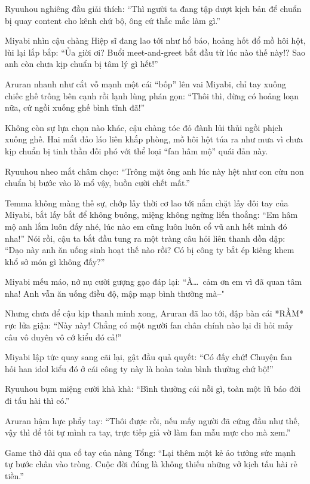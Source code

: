 \documentclass[../main.tex]{subfiles}
\begin{document}
Ryuuhou nghiêng đầu giải thích: ``Thì người ta đang tập dượt kịch bản để chuẩn bị quay content cho kênh chứ bộ, ông cứ thắc mắc làm gì.''

Miyabi nhìn cậu chàng Hiệp sĩ đang lao tới như hổ báo, hoảng hốt đổ mồ hôi hột, lùi lại lắp bắp: ``Ủa giời ơi? Buổi meet-and-greet bắt đầu từ lúc nào thế này!? Sao anh còn chưa kịp chuẩn bị tâm lý gì hết!''

Aruran nhanh như cắt vỗ mạnh một cái ``bốp'' lên vai Miyabi, chỉ tay xuống chiếc ghế trống bên cạnh rồi lạnh lùng phán gọn: ``Thôi thì, đừng có hoảng loạn nữa, cứ ngồi xuống ghế bình tĩnh đã!''

Không còn sự lựa chọn nào khác, cậu chàng tóc đỏ đành lủi thủi ngồi phịch xuống ghế. Hai mắt đảo láo liên khắp phòng, mồ hôi hột túa ra như mưa vì chưa kịp chuẩn bị tinh thần đối phó với thể loại ``fan hâm mộ'' quái đản này.

Ryuuhou nheo mắt châm chọc: ``Trông mặt ông anh lúc này hệt như con cừu non chuẩn bị bước vào lò mổ vậy, buồn cười chết mất.''

Temma không màng thế sự, chớp lấy thời cơ lao tới nắm chặt lấy đôi tay của Miyabi, bắt lấy bắt để không buông, miệng không ngừng liến thoắng: ``Em hâm mộ anh lắm luôn đấy nhé, lúc nào em cũng luôn luôn cổ vũ anh hết mình đó nha!'' Nói rồi, cậu ta bắt đầu tung ra một tràng câu hỏi liên thanh dồn dập: ``Dạo này anh ăn uống sinh hoạt thế nào rồi? Có bị công ty bắt ép kiêng khem khổ sở món gì không đấy?''

Miyabi mếu máo, nở nụ cười gượng gạo đáp lại: ``À\dots\ cảm ơn em vì đã quan tâm nha! Anh vẫn ăn uống điều độ, mập mạp bình thường mà--"

Nhưng chưa để cậu kịp thanh minh xong, Aruran đã lao tới, đập bàn cái *RẦM* rực lửa giận: ``Này này! Chẳng có một người fan chân chính nào lại đi hỏi mấy câu vô duyên vô cớ kiểu đó cả!''


Miyabi lập tức quay sang cãi lại, gật đầu quả quyết: ``Có đấy chứ! Chuyện fan hỏi han idol kiểu đó ở cái công ty này là hoàn toàn bình thường chứ bộ!''

Ryuuhou bụm miệng cười khà khà: ``Bình thường cái nỗi gì, toàn một lũ báo đời đi tấu hài thì có.''

Aruran hậm hực phẩy tay: ``Thôi được rồi, nếu mấy người đã cứng đầu như thế, vậy thì để tôi tự mình ra tay, trực tiếp giả vờ làm fan mẫu mực cho mà xem.''

Game thở dài qua cổ tay của nàng Tổng: ``Lại thêm một kẻ ảo tưởng sức mạnh tự bước chân vào tròng. Cuộc đời đúng là không thiếu những vở kịch tấu hài rẻ tiền.''
\end{document}
